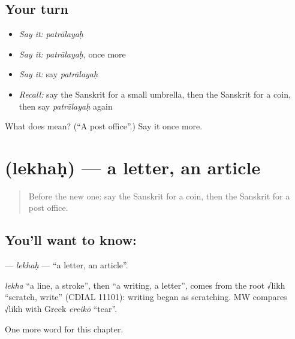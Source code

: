\subsection*{Your turn}
\begin{itemize}
\raggedright
  \item \emph{Say it:} \emph{patrālayaḥ}
  \item \emph{Say it:} \emph{patrālayaḥ}, once more
  \item \emph{Say it:} say \emph{patrālayaḥ}
  \item \emph{Recall:} say the Sanskrit for a small umbrella, then the Sanskrit for a coin, then say \emph{patrālayaḥ} again
\end{itemize}

\begin{tcolorbox}[breakable,colback=teal!4,colframe=teal!35!black,title={Before you move on}]
What does  mean? (\textquotedblleft{}A post office\textquotedblright{}.) Say it once more.
\end{tcolorbox}
\section[\texorpdfstring{\sk{लेखः} (lekhaḥ)}{लेखः (lekhaḥ)}]{ (lekhaḥ) — a letter, an article}

\label{lesson:SA-C120-lekhah}



\begin{quote}
Before the new one: say the Sanskrit for a coin, then the Sanskrit for a post office.
\end{quote}

\subsection*{You'll want to know: }
\textbf{} — \emph{lekhaḥ} — \textquotedblleft{}a letter, an article\textquotedblright{}.

\begin{cousinweb}
\emph{lekha} \textquotedblleft{}a line, a stroke\textquotedblright{}, then \textquotedblleft{}a writing, a letter\textquotedblright{}, comes from the root √likh \textquotedblleft{}scratch, write\textquotedblright{} (CDIAL 11101): writing began as scratching. MW compares √likh with Greek \emph{ereikō} \textquotedblleft{}tear\textquotedblright{}.
\end{cousinweb}

\begin{grammarlens}[title={What you've built}]
One more word for this chapter.
\end{grammarlens}

